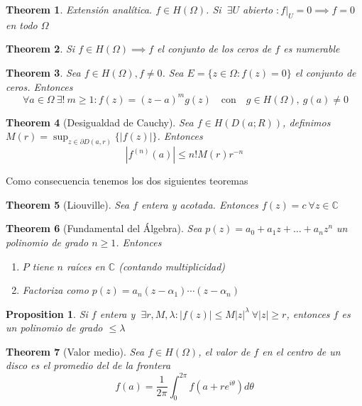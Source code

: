 \documentclass[leqno]{article}
\newtheorem*{theorem}{Theorem}
\newtheorem*{proposition}{Proposition}
\begin{document}
\begin{theorem}
Extensión analítica. $f\in H(\Omega)$. Si $\ \exists U$ abierto $: f|_U=0 \implies f=0$ en todo $\Omega$
\end{theorem}

\begin{theorem}
Si $f\in H(\Omega) \implies f$ el conjunto de los ceros de $f$ es numerable
\end{theorem}

\begin{theorem} Sea $f\in H(\Omega), f\neq 0$. Sea $E = \{z\in \Omega : f(z) = 0\}$ el conjunto de ceros. Entonces
  \[
  \ \forall a\in \Omega \ \exists ! \ m\ge 1 : f(z) = (z-a)^mg(z) \quad \text{con} \quad g\in H(\Omega),\ g(a)\neq 0
  \] 

\end{theorem}

\begin{theorem}[Desigualdad de Cauchy]
Sea $f\in H(D(a;R))$, definimos $M(r) = \sup_{z\in \partial D(a, r)} \{|f(z)|\}$. Entonces
\[
|f^{(n)}(a)|\le n! M(r) r^{-n}
\] 
\end{theorem}

Como consecuencia tenemos los dos siguientes teoremas

\begin{theorem}[Liouville]
Sea $f$ entera y acotada. Entonces $f(z) = c \ \forall z\in \mathbb{C}$ 
\end{theorem}

\begin{theorem}[Fundamental del Álgebra]
Sea $p(z) = a_0 + a_1z + \ldots + a_nz^n$ un polinomio de grado $n\ge 1$. Entonces 
\begin{enumerate}[topsep=-6pt, itemsep=0pt]
  \item $P$ tiene  $n$ raíces en  $\mathbb{C}$ (contando multiplicidad) 
  \item Factoriza como  $p(z)= a_n(z-\alpha _1) \cdots (z-\alpha _n)$
\end{enumerate}
\end{theorem}

\begin{proposition}
Si $f$ entera y $\ \exists r, M, \lambda: |f(z)|\le M|z|^\lambda \ \forall |z|\ge r$, entonces $f$ es un polinomio de grado  $\le \lambda$
\end{proposition}

\begin{theorem}[Valor medio]
Sea $f\in H(\Omega)$, el valor de $f$ en el centro de un disco es el promedio del de la frontera
\[
f(a) = \frac{1}{2\pi}\int_0^{2\pi}f(a+ re^{i \theta}) d\theta
\] 
\end{theorem}
\end{document}
